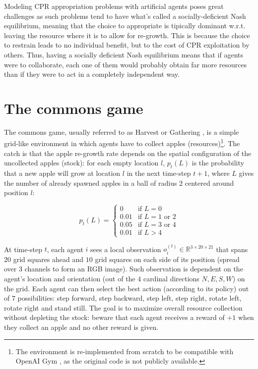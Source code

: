 \documentclass{article}
\begin{document}
Modeling CPR appropriation problems with artificial agents poses great challenges as such problems tend to have what's called a socially-deficient Nash equilibrium, meaning that the choice to appropriate is tipically dominant w.r.t. leaving the resource where it is to allow for re-growth. This is because the choice to restrain leads to no individual benefit, but to the cost of CPR exploitation by others. Thus, having a socially deficient Nash equilibrium means that if agents were to collaborate, each one of them would probably obtain far more resources than if they were to act in a completely independent way.

\section{The commons game}
The commons game, usually referred to as Harvest \cite{harvest} or Gathering \cite{sequential-social-dilemmas}, is a simple grid-like environment in which agents have to collect apples (resources)\footnote{The environment is re-implemented from scratch to be compatible with OpenAI Gym \cite{gym}, as the original code is not publicly available.}. The catch is that the apple re-growth rate depends on the spatial configuration of the uncollected apples (stock): for each empty location $l$, $p_t(L)$ is the probability that a new apple will grow at location $l$ in the next time-step $t+1$, where $L$ gives the number of already spawned apples in a ball of radius $2$ centered around position $l$: 

\[
  p_t(L)= 
  \begin{cases} 
    0 & \text{if } L = 0 \\
    0.01 & \text{if } L = 1 \text{ or } 2 \\
    0.05 & \text{if } L = 3 \text{ or } 4 \\
    0.01 & \text{if } L > 4 
  \end{cases}
\]

At time-step $t$, each agent $i$ sees a local observation $o_i^{(t)}\in\mathbb{R}^{3\times20\times21}$ that spans $20$ grid squares ahead and $10$ grid squares on each side of its position (spread over $3$ channels to form an RGB image). Such observation is dependent on the agent's location and orientation (out of the $4$ cardinal directions $N, E, S, W$) on the grid. Each agent can then select the best action (according to its policy) out of $7$ possibilities: step forward, step backward, step left, step right, rotate left, rotate right and stand still. The goal is to maximize overall resource collection without depleting the stock: beware that each agent receives a reward of $+1$ when they collect an apple and no other reward is given.
\end{document}
